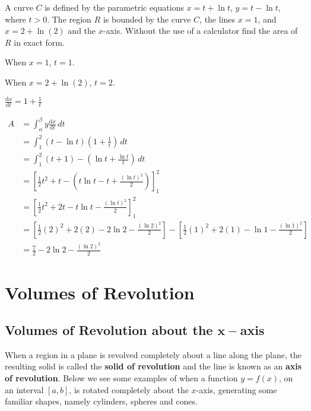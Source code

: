 \documentclass[11pt,a4paper]{book}
\begin{document}
\begin{example}

A curve $C$ is defined by the parametric equations $x=t+\ln t$,
$y=t-\ln t$, where $t>0$. The region $R$ is bounded by the curve
$C$, the lines $x=1$, and $x=2+\ln(2)$ and the $x$-axis. Without
the use of a calculator find the area of $R$ in exact form.

\Solution

When $x=1$, $t=1$.

When $x=2+\ln(2)$, $t=2$.

${\displaystyle \frac{\mathrm{d}x}{\mathrm{d}t}=1+\frac{1}{t}}$

\begin{align*}
A & =\int_{\alpha}^{\beta}y\frac{\mathrm{d}x}{\mathrm{d}t}\,dt\\
 & =\int_{1}^{2}(t-\ln t)\left(1+\frac{1}{t}\right)\,dt\\
 & =\int_{1}^{2}(t+1)-\left(\ln t+\frac{\ln t}{t}\right)\,dt\\
 & =\left[\frac{1}{2}t^{2}+t-\left(t\ln t-t+\frac{\left(\ln t\right)^{2}}{2}\right)\right]_{1}^{2}\\
 & =\left[\frac{1}{2}t^{2}+2t-t\ln t-\frac{\left(\ln t\right)^{2}}{2}\right]_{1}^{2}\\
 & =\left[\frac{1}{2}(2)^{2}+2(2)-2\ln2-\frac{\left(\ln2\right)^{2}}{2}\right]-\left[\frac{1}{2}(1)^{2}+2(1)-\ln1-\frac{\left(\ln1\right)^{2}}{2}\right]\\
 & =\frac{7}{2}-2\ln2-\frac{\left(\ln2\right)^{2}}{2}
\end{align*}

\end{example}

\newpage

\section{Volumes of Revolution}

\subsection{Volumes of Revolution about the $\boldsymbol{x-}$axis}

When a region in a plane is revolved completely about a line along
the plane, the resulting solid is called the \textbf{solid of revolution}
and the line is known as an \textbf{axis of revolution}. Below we
see some examples of when a function $y=f(x)$, on an interval $[a,b]$,
is rotated completely about the $x$-axis, generating some familiar
shapes, namely cylinders, spheres and cones.
\end{document}
